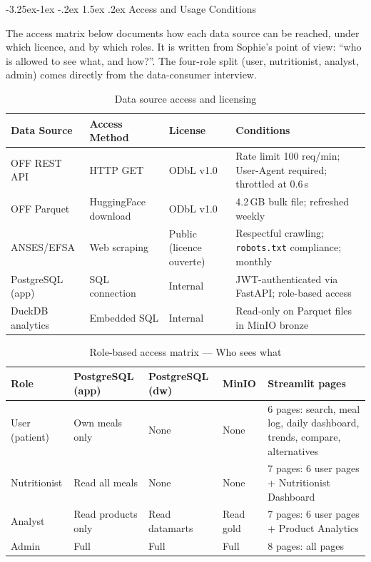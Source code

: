 \documentclass[a4paper,11pt,oneside,openany]{report}
\makeatletter
\renewcommand\subsubsection{\@startsection{subsubsection}{3}{\z@}%
  {-3.25ex\@plus -1ex \@minus -.2ex}%
  {1.5ex \@plus .2ex}%
  {\normalfont\normalsize\bfseries\color{ntblue}}}
\makeatother
\begin{document}
\subsubsection{Access and Usage Conditions}

The access matrix below documents how each data source can be
reached, under which licence, and by which roles. It is written
from Sophie's point of view: ``who is allowed to see what, and
how?''. The four-role split (user, nutritionist, analyst, admin)
comes directly from the data-consumer interview.

\begin{table}[H]
\centering
\caption{Data source access and licensing}
\label{tab:access-conditions}
\begin{tabularx}{\textwidth}{L{2.5cm} L{2.5cm} L{3cm} L{4.5cm}}
\toprule
\textbf{Data Source} & \textbf{Access Method} & \textbf{License} & \textbf{Conditions} \\
\midrule
OFF REST API & HTTP GET & ODbL v1.0 & Rate limit 100 req/min; User-Agent required; throttled at 0.6\,s \\
OFF Parquet & HuggingFace download & ODbL v1.0 & 4.2\,GB bulk file; refreshed weekly \\
ANSES/EFSA & Web scraping & Public (licence ouverte) & Respectful crawling; \texttt{robots.txt} compliance; monthly \\
PostgreSQL (app) & SQL connection & Internal & JWT-authenticated via FastAPI; role-based access \\
DuckDB analytics & Embedded SQL & Internal & Read-only on Parquet files in MinIO bronze \\
\bottomrule
\end{tabularx}
\end{table}

\begin{table}[H]
\centering
\caption{Role-based access matrix --- Who sees what}
\label{tab:rbac-matrix}
\begin{tabularx}{\textwidth}{L{2.3cm} L{2.8cm} L{2.8cm} L{2.8cm} L{2.3cm}}
\toprule
\textbf{Role} & \textbf{PostgreSQL (app)} & \textbf{PostgreSQL (dw)} & \textbf{MinIO} & \textbf{Streamlit pages} \\
\midrule
User (patient) & Own meals only & None & None & 6 pages: search, meal log, daily dashboard, trends, compare, alternatives \\
Nutritionist & Read all meals & None & None & 7 pages: 6 user pages + Nutritionist Dashboard \\
Analyst & Read products only & Read datamarts & Read gold & 7 pages: 6 user pages + Product Analytics \\
Admin & Full & Full & Full & 8 pages: all pages \\
\bottomrule
\end{tabularx}
\end{table}
\end{document}
